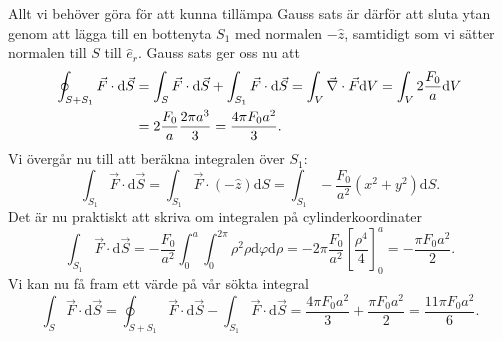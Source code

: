 \documentclass[%
oneside,                 %
final,                   %
10pt]{article}
\newenvironment{notice_mdfboxadmon}[1][]{
\begin{notice_mdfboxmdframed}[frametitle=#1]
}
{
\end{notice_mdfboxmdframed}
}
\begin{document}
\begin{notice_mdfboxadmon}
Allt vi behöver göra för att kunna tillämpa Gauss sats är därför att sluta ytan genom att lägga till en bottenyta $S_1$ med normalen $-\hat{z}$, samtidigt som vi sätter normalen till $S$ till $\hat{e}_r$.  Gauss sats ger oss nu att
\begin{align}
  \oint_{S+S_1} \vec{F}\cdot \mbox{d}\vec{S} &= \int_S \vec{F}\cdot \mbox{d}\vec{S} +
\int_{S_1} \vec{F}\cdot \mbox{d}\vec{S} = \int_V \vec{\nabla} \cdot \vec{F} \mbox{d}V =
\int_V 2 \frac{F_0}{a} \mbox{d}V \nonumber \\
& = 2\frac{F_0}{a} \frac{2\pi a^3}{3} =
\frac{4\pi F_0 a^2}{3}.
\end{align}
Vi övergår nu till att beräkna integralen över $S_1$:
\begin{equation}
  \int_{S_1} \vec{F}\cdot \mbox{d}\vec{S} = \int_{S_1} \vec{F} \cdot \left(-
\hat{z} \right) \mbox{d}S = \int_{S_1} - \frac{F_0}{a^2} \left(x^2 + y^2
\right) \mbox{d}S.
\end{equation}
Det är nu praktiskt att skriva om integralen på cylinderkoordinater
\begin{equation}
  \int_{S_1} \vec{F}\cdot \mbox{d}\vec{S} = - \frac{F_0}{a^2} \int_0^a
\int_0^{2\pi} \rho^2 \rho \mbox{d}\varphi \mbox{d}\rho = -2\pi 
\frac{F_0}{a^2} \left[\frac{\rho^4}{4}\right]_0^a = - \frac{\pi F_0 a^2}{2}.
\end{equation}
Vi kan nu få fram ett värde på vår sökta integral
\begin{equation}
  \int_S \vec{F}\cdot \mbox{d}\vec{S} = \oint_{S+S_1} \vec{F}\cdot \mbox{d}\vec{S}
-\int_{S_1} \vec{F}\cdot \mbox{d}\vec{S} = \frac{4\pi F_0 a^2}{3} + 
\frac{\pi F_0 a^2}{2} = \frac{11\pi F_0 a^2}{6}.
\end{equation}
\end{notice_mdfboxadmon} %
\end{document}
